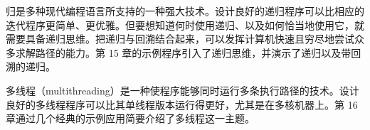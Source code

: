 归是多种现代编程语言所支持的一种强大技术。设计良好的递归程序可以比相应的迭代程序更简单、更优雅。但要想知道何时使用递归、以及如何恰当地使用它，就需要具备递归思维。把递归与回溯结合起来，可以发挥计算机快速且穷尽地尝试众多求解路径的能力。第 15 章的示例程序引入了递归思维，并演示了递归以及带回溯的递归。

多线程（multithreading）是一种使程序能够同时运行多条执行路径的技术。设计良好的多线程程序可以比其单线程版本运行得更好，尤其是在多核机器上。第 16 章通过几个经典的示例应用简要介绍了多线程这一主题。
